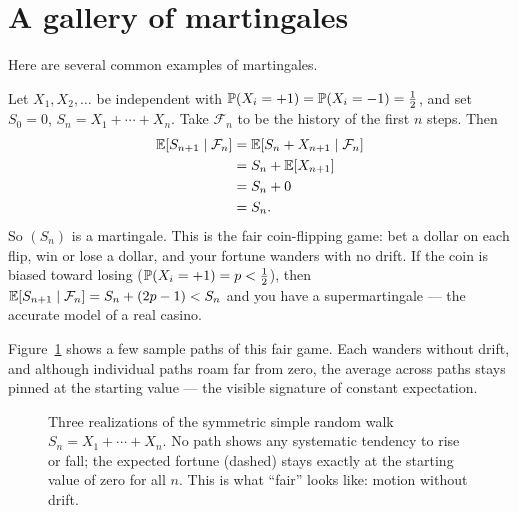 \section{A gallery of martingales}
\label{ch28:examples}

Here are several common examples of martingales.

\begin{example}
\label{ch28:ex-walk}
Let $X_1, X_2, \dots$ be independent with $\P(X_i = +1) = \P(X_i = -1) = \tfrac12$, and set
$S_0 = 0$, $S_n = X_1 + \cdots + X_n$. Take $\mathcal{F}_n$ to be the history of the first $n$ steps.
Then
\begin{align*}
  \E[S_{n+1}\given\mathcal{F}_n] &= \E[S_n + X_{n+1}\given\mathcal{F}_n] \\
  &= S_n + \E[X_{n+1}] \\
  &= S_n + 0 \\
  &= S_n.
\end{align*}
So $(S_n)$ is a martingale. This is the fair coin-flipping game: bet a dollar on each flip, win or lose
a dollar, and your fortune wanders with no drift. If the coin is biased toward losing
($\P(X_i = +1) = p < \tfrac12$), then $\E[S_{n+1}\given \mathcal{F}_n] = S_n + (2p-1) < S_n$ and you
have a supermartingale --- the accurate model of a real casino.
\end{example}

Figure~\ref{ch28:fig-walk} shows a few sample paths of this fair game. Each wanders without drift, and
although individual paths roam far from zero, the average across paths stays pinned at the starting
value --- the visible signature of constant expectation.

\begin{figure}[H]
\centering
{}
\caption{Three realizations of the symmetric simple random walk $S_n = X_1 + \cdots + X_n$. No path
shows any systematic tendency to rise or fall; the expected fortune (dashed) stays exactly at the
starting value of zero for all $n$. This is what ``fair'' looks like: motion without drift.}
\label{ch28:fig-walk}
\end{figure}

